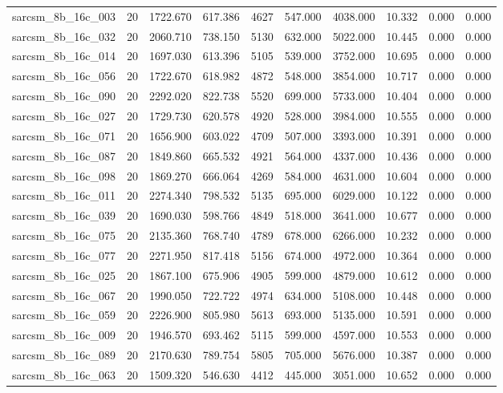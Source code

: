 \begin{tabular}{lrrrrrrrrr}
sarcsm\_8b\_16c\_003 & 20 & 1722.670 & 617.386 & 4627 & 547.000 & 4038.000 & 10.332 & 0.000 & 0.000 \\
sarcsm\_8b\_16c\_032 & 20 & 2060.710 & 738.150 & 5130 & 632.000 & 5022.000 & 10.445 & 0.000 & 0.000 \\
sarcsm\_8b\_16c\_014 & 20 & 1697.030 & 613.396 & 5105 & 539.000 & 3752.000 & 10.695 & 0.000 & 0.000 \\
sarcsm\_8b\_16c\_056 & 20 & 1722.670 & 618.982 & 4872 & 548.000 & 3854.000 & 10.717 & 0.000 & 0.000 \\
sarcsm\_8b\_16c\_090 & 20 & 2292.020 & 822.738 & 5520 & 699.000 & 5733.000 & 10.404 & 0.000 & 0.000 \\
sarcsm\_8b\_16c\_027 & 20 & 1729.730 & 620.578 & 4920 & 528.000 & 3984.000 & 10.555 & 0.000 & 0.000 \\
sarcsm\_8b\_16c\_071 & 20 & 1656.900 & 603.022 & 4709 & 507.000 & 3393.000 & 10.391 & 0.000 & 0.000 \\
sarcsm\_8b\_16c\_087 & 20 & 1849.860 & 665.532 & 4921 & 564.000 & 4337.000 & 10.436 & 0.000 & 0.000 \\
sarcsm\_8b\_16c\_098 & 20 & 1869.270 & 666.064 & 4269 & 584.000 & 4631.000 & 10.604 & 0.000 & 0.000 \\
sarcsm\_8b\_16c\_011 & 20 & 2274.340 & 798.532 & 5135 & 695.000 & 6029.000 & 10.122 & 0.000 & 0.000 \\
sarcsm\_8b\_16c\_039 & 20 & 1690.030 & 598.766 & 4849 & 518.000 & 3641.000 & 10.677 & 0.000 & 0.000 \\
sarcsm\_8b\_16c\_075 & 20 & 2135.360 & 768.740 & 4789 & 678.000 & 6266.000 & 10.232 & 0.000 & 0.000 \\
sarcsm\_8b\_16c\_077 & 20 & 2271.950 & 817.418 & 5156 & 674.000 & 4972.000 & 10.364 & 0.000 & 0.000 \\
sarcsm\_8b\_16c\_025 & 20 & 1867.100 & 675.906 & 4905 & 599.000 & 4879.000 & 10.612 & 0.000 & 0.000 \\
sarcsm\_8b\_16c\_067 & 20 & 1990.050 & 722.722 & 4974 & 634.000 & 5108.000 & 10.448 & 0.000 & 0.000 \\
sarcsm\_8b\_16c\_059 & 20 & 2226.900 & 805.980 & 5613 & 693.000 & 5135.000 & 10.591 & 0.000 & 0.000 \\
sarcsm\_8b\_16c\_009 & 20 & 1946.570 & 693.462 & 5115 & 599.000 & 4597.000 & 10.553 & 0.000 & 0.000 \\
sarcsm\_8b\_16c\_089 & 20 & 2170.630 & 789.754 & 5805 & 705.000 & 5676.000 & 10.387 & 0.000 & 0.000 \\
sarcsm\_8b\_16c\_063 & 20 & 1509.320 & 546.630 & 4412 & 445.000 & 3051.000 & 10.652 & 0.000 & 0.000 \\

\end{tabular}
